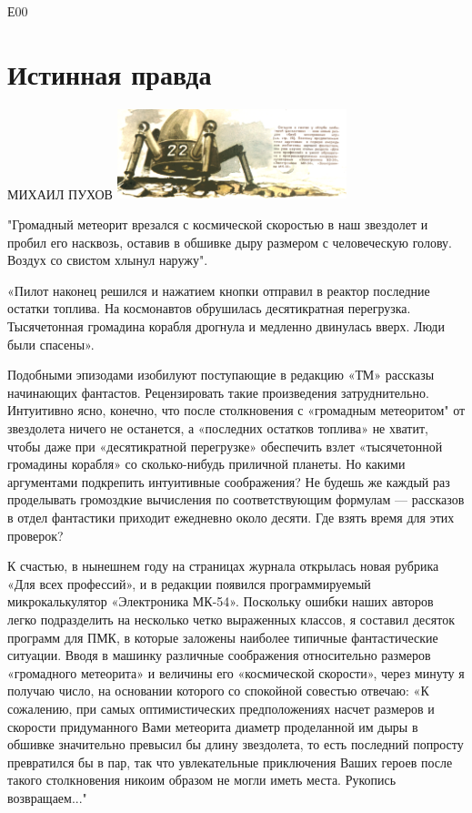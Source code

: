 \documentclass[11pt,a4paper,oneside]{article}
\begin{document}
Е00

\section{Истинная правда}
\label{truth}
МИХАИЛ ПУХОВ
\includegraphics[width=0.5\textwidth]{real_truth}

"Громадный метеорит врезался с космической скоростью в наш звездолет и пробил его насквозь, оставив в обшивке дыру размером с человеческую голову. Воздух со свистом хлынул наружу".

«Пилот наконец решился и нажатием кнопки отправил в реактор последние остатки топлива. На космонавтов обрушилась десятикратная перегрузка. Тысячетонная громадина корабля дрогнула и медленно двинулась вверх. Люди были спасены».

Подобными эпизодами изобилуют поступающие в редакцию «ТМ» рассказы начинающих фантастов. Рецензировать такие произведения затруднительно. Интуитивно ясно, конечно, что после столкновения с «громадным метеоритом" от звездолета ничего не останется, а «последних остатков топлива» не хватит, чтобы даже при «десятикратной перегрузке» обеспечить взлет «тысячетонной громадины корабля» со сколько-нибудь приличной планеты. Но какими аргументами подкрепить интуитивные соображения? Не будешь же каждый раз проделывать громоздкие вычисления по соответствующим формулам — рассказов в отдел фантастики приходит ежедневно около десяти. Где взять время для этих проверок?

К счастью, в нынешнем году на страницах журнала открылась новая рубрика «Для всех профессий», и в редакции появился программируемый микрокалькулятор «Электроника МК-54». Поскольку ошибки наших авторов легко подразделить на несколько четко выраженных классов, я составил десяток программ для ПМК, в которые заложены наиболее типичные фантастические ситуации. Вводя в машинку различные соображения относительно размеров «громадного метеорита» и величины его «космической скорости», через минуту я получаю число, на основании которого со спокойной совестью отвечаю: «К сожалению, при самых оптимистических предположениях насчет размеров и скорости придуманного Вами метеорита диаметр проделанной им дыры в обшивке значительно превысил бы длину звездолета, то есть последний попросту превратился бы в пар, так что увлекательные приключения Ваших героев после такого столкновения никоим образом не могли иметь места. Рукопись возвращаем..."
\end{document}
